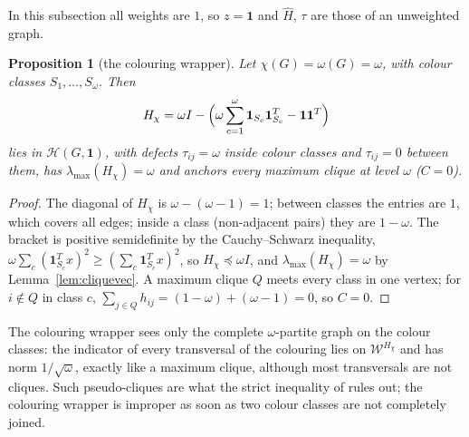 \documentclass[11pt]{article}
\newtheorem{prop}[thm]{Proposition}
\theoremstyle{definition}
\theoremstyle{remark}
\newcommand{\Hc}{\mathcal{H}}
\newcommand{\Wc}{\mathcal{W}}
\newcommand{\hH}{\hat{H}}
\newcommand{\one}{\mathbf{1}}
\newcommand{\lmax}{\lambda_{\max}}
\begin{document}
In this subsection all weights are $1$, so $z=\one$ and $\hH$, $\tau$ are
those of an unweighted graph.

\begin{prop}[the colouring wrapper]
\label{prop:colour}
Let $\chi(G)=\omega(G)=\omega$, with colour classes $S_1,\ldots,S_\omega$.
Then
\[ H_\chi=\omega I-\Bigl(\omega\sum_{c=1}^{\omega}\one_{S_c}\one_{S_c}^T
-\one\one^T\Bigr) \]
lies in $\Hc(G,\one)$, with defects $\tau_{ij}=\omega$ inside colour
classes and $\tau_{ij}=0$ between them, has $\lmax(H_\chi)=\omega$ and
anchors every maximum clique at level $\omega$ ($C=0$).
\end{prop}
\begin{proof}
The diagonal of $H_\chi$ is $\omega-(\omega-1)=1$; between classes the
entries are $1$, which covers all edges; inside a class (non-adjacent
pairs) they are $1-\omega$. The bracket is positive semidefinite by the
Cauchy--Schwarz inequality,
$\omega\sum_c(\one_{S_c}^Tx)^2\geq(\sum_c\one_{S_c}^Tx)^2$, so
$H_\chi\preceq\omega I$, and $\lmax(H_\chi)=\omega$ by
Lemma~\ref{lem:cliquevec}. A maximum clique $Q$ meets every class in one
vertex; for $i\notin Q$ in class $c$, $\sum_{j\in Q}h_{ij}=(1-\omega)+
(\omega-1)=0$, so $C=0$.
\end{proof}

The colouring wrapper sees only the complete $\omega$-partite graph on the
colour classes: the indicator of every transversal of the colouring lies on
$\Wc^{H_\chi}$ and has norm $1/\sqrt{\omega}$, exactly like a maximum
clique, although most transversals are not cliques. Such pseudo-cliques are
what the strict inequality of \cite[Proposition~2]{CW} rules out; the
colouring wrapper is improper as soon as two colour classes are not
completely joined.
\end{document}
